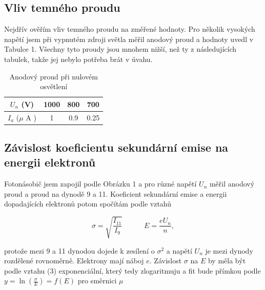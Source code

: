 \documentclass[a4paper,11pt]{article}
\begin{document}
\subsection{Vliv temného proudu}

Nejdřív ověřím vliv temného proudu na změřené hodnoty. Pro několik vysokých napětí jsem při vypnutém zdroji světla měřil anodový proud a hodnoty uvedl v Tabulce 1. Všechny tyto proudy jsou mnohem nižší, než ty z následujících tabulek, takže jej nebylo potřeba brát v úvahu.

\begin{table}[htpb]
    \centering
    \begin{tabular}{  c | c c c }
        $ U_n $ (V) & 1000 & 800 & 700 \\
        \hline
        $ I_a $ ($ \mu $ A ) & 1 & 0.9 & 0.25 \\
    \end{tabular} 
    \caption{Anodový proud při nulovém osvětlení}
\end{table}


\subsection{Závislost koeficientu sekundární emise na energii elektronů}

Fotonásobič jsem zapojil podle Obrázku 1 a pro různé napětí $ U_n $ měřil anodový proud a proud na dynodě 9 a 11. Koeficient sekundární emise a energii dopadajících elektronů potom spočítám podle vztahů

\begin{equation}
\sigma = \sqrt{\frac{I_{11}}{I_{9}}} \quad \quad  \quad E = \frac{e U_n}{n},
\end{equation}

\noindent
protože mezi 9 a 11 dynodou dojede k zesílení o $ \sigma^{2} $ a napětí $ U_n $  je mezi dynody rozdělené rovnoměrně. Elektrony mají náboj $ e $. Závislost $ \sigma $ na $ E $ by měla být podle vztahu (3) exponenciální, který tedy zlogaritmuju a fit bude přímkou podle $ y = \ln (\frac{\sigma}{E}) = f(E) $ pro směrnici $ \mu $ 
\end{document}
